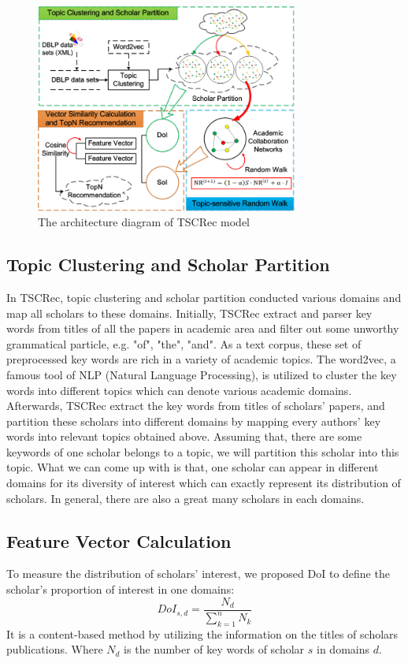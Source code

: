 \documentclass{chi-ext}
\begin{document}
\begin{figure}
\centering
\includegraphics [width=3.4in]{Fig1.png}
\caption{The architecture diagram of TSCRec model}
\end{figure}

\subsection{Topic Clustering and Scholar Partition}
In TSCRec, topic clustering and scholar partition conducted various domains and map all scholars to these domains. Initially, TSCRec extract and parser key words from titles of all the papers in academic area and filter out some unworthy grammatical particle, e.g. "of", "the", "and". As a text corpus, these set of preprocessed key words are rich in a variety of academic topics. The word2vec, a famous tool of NLP (Natural Language Processing), is utilized to cluster the key words into different topics which can denote various academic domains. Afterwards, TSCRec extract the key words from titles of scholars' papers, and partition these scholars into different domains by mapping every authors' key words into relevant topics obtained above. Assuming that, there are some keywords of one scholar belongs to a topic, we will partition this scholar into this topic. What we can come up with is that, one scholar can appear in different domains for its diversity of interest which can exactly represent its distribution of scholars. In general, there are also a great many scholars in each domains.

\subsection{Feature Vector Calculation}
To measure the distribution of scholars' interest, we proposed DoI to define the scholar's proportion of interest in one domains:
\begin{equation}
DoI_{s,d}=\frac{N_{d}}{\sum_{k=1}^{n} N_{k}}
\end{equation}
It is a content-based method by utilizing the  information on the titles of scholars publications. Where $N_{d}$ is the number of key words of scholar $s$ in domains $d$.
\end{document}
